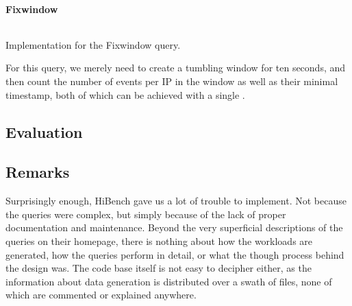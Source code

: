 \paragraph{Fixwindow}
\begin{listing}[H]
  \inputminted[firstline=209,lastline=213]{rust}{benchmarks/src/hibench.rs}
  \caption{Implementation for the Fixwindow query.}
  \label{lst:hibench-fixwindow}
\end{listing}

For this query, we merely need to create a tumbling window for ten seconds, and then count the number of events per IP in the window as well as their minimal timestamp, both of which can be achieved with a single .

\subsection{Evaluation}



\subsection{Remarks}\label{section:hibench-remarks}
Surprisingly enough, HiBench gave us a lot of trouble to implement. Not because the queries were complex, but simply because of the lack of proper documentation and maintenance. Beyond the very superficial descriptions of the queries on their homepage, there is nothing about how the workloads are generated, how the queries perform in detail, or what the though process behind the design was. The code base itself is not easy to decipher either, as the information about data generation is distributed over a swath of files, none of which are commented or explained anywhere. \\

